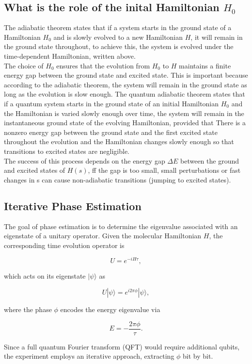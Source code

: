 \documentclass[11pt]{article}
\begin{document}
\subsection*{What is the role of the inital Hamiltonian $H_0$}
The adiabatic theorem states that if a system starts in the ground state of a Hamiltonian $H_0$ and is slowly evolved to a new Hamiltonian $H$, it will remain in the ground state throughout, to achieve this, the system is evolved under the time-dependent Hamiltonian, written above.\\
The choice of $H_0$ ensures that the evolution from $H_0$ to $H$ maintains a finite energy gap between the ground state and excited state. This is important because according to the adiabatic theorem, the system will remain in the ground state as long as the evolution is slow enough. The quantum adiabatic theorem states that if a quantum system starts in the ground state of an initial Hamiltonian $H_0$ and the Hamiltonian is varied slowly enough over time, the system will remain in the instantaneous ground state of the evolving Hamiltonian, provided that There is a nonzero energy gap between the ground state and the first excited state throughout the evolution and the Hamiltonian changes slowly enough so that transitions to excited states are negligible. \\
The success of this process depends on the energy gap $\Delta E$ between the ground and excited states of $H(s)$, ff the gap is too small, small perturbations or fast changes in s can cause non-adiabatic transitions (jumping to excited states).\\

\subsection*{Iterative Phase Estimation}
The goal of phase estimation is to determine the eigenvalue associated with an eigenstate of a unitary operator. Given the molecular Hamiltonian \( H \), the corresponding time evolution operator is 

\[
U = e^{-i H \tau},
\]

which acts on its eigenstate \( |\psi\rangle \) as 

\[
U |\psi\rangle = e^{i 2\pi \phi} |\psi\rangle,
\]

where the phase \( \phi \) encodes the energy eigenvalue via

\[
E = -\frac{2\pi \phi}{\tau}.
\]

Since a full quantum Fourier transform (QFT) would require additional qubits, the experiment employs an iterative approach, extracting \( \phi \) bit by bit.
\end{document}
